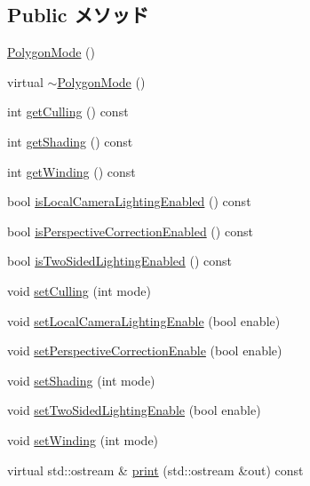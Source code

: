 \subsection*{Public メソッド}
\begin{CompactItemize}
\item 
\hyperlink{classm3g_1_1PolygonMode_b089ee808cbc4799bb2e92dd4ca554c3}{PolygonMode} ()
\item 
virtual \hyperlink{classm3g_1_1PolygonMode_64ea3958d7ec67fc648707782b2221fe}{$\sim$PolygonMode} ()
\item 
int \hyperlink{classm3g_1_1PolygonMode_3b0c0325e93774222d828f2612d59b1b}{getCulling} () const 
\item 
int \hyperlink{classm3g_1_1PolygonMode_c09a62f099e07df16a8c21f997b9f6a6}{getShading} () const 
\item 
int \hyperlink{classm3g_1_1PolygonMode_6000aac10def51a7c7f12e1381bce19d}{getWinding} () const 
\item 
bool \hyperlink{classm3g_1_1PolygonMode_b8db417fcee613ac80e84087046930cd}{isLocalCameraLightingEnabled} () const 
\item 
bool \hyperlink{classm3g_1_1PolygonMode_76ec871d6ed45e6e6a8822f5c45c828b}{isPerspectiveCorrectionEnabled} () const 
\item 
bool \hyperlink{classm3g_1_1PolygonMode_e7b9f0464063485b025f11a310bb0b80}{isTwoSidedLightingEnabled} () const 
\item 
void \hyperlink{classm3g_1_1PolygonMode_55b3fc23392376c00748d68bdf44ca60}{setCulling} (int mode)
\item 
void \hyperlink{classm3g_1_1PolygonMode_232d4cff53e6fc4863e144dc61e9465c}{setLocalCameraLightingEnable} (bool enable)
\item 
void \hyperlink{classm3g_1_1PolygonMode_81003e409298c3247ab2fed98a7270e9}{setPerspectiveCorrectionEnable} (bool enable)
\item 
void \hyperlink{classm3g_1_1PolygonMode_ebd2bc289af0e5cbee5ea29cbc55ba5a}{setShading} (int mode)
\item 
void \hyperlink{classm3g_1_1PolygonMode_8687b0d3016a777d32e7ebfa1ffd45aa}{setTwoSidedLightingEnable} (bool enable)
\item 
void \hyperlink{classm3g_1_1PolygonMode_5535581a651835a0da246b5936c2f0b5}{setWinding} (int mode)
\item 
virtual std::ostream \& \hyperlink{classm3g_1_1PolygonMode_6fea17fa1532df3794f8cb39cb4f911f}{print} (std::ostream \&out) const 
\end{CompactItemize}

